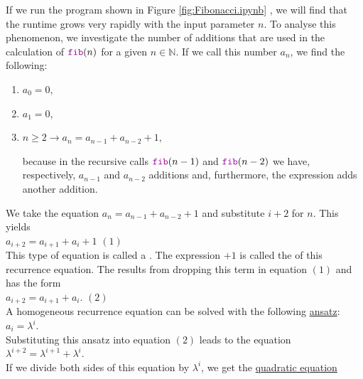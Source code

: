 If we run the program shown in Figure \ref{fig:Fibonacci.ipynb} , we will find that the runtime grows very rapidly with
the input parameter $n$.  To analyse this phenomenon, we investigate the number of additions that are used in the
calculation of $\mytt{fib}(n)$ for a given $n \in \mathbb{N}$.  If we call this number $a_n$, we find
the following:
\begin{enumerate}
\item $a_0 = 0$,
\item $a_1 = 0$,
\item $n \geq 2 \rightarrow a_n = a_{n-1} + a_{n-2} + 1$,

      because in the recursive calls $\mytt{fib}(n-1)$ and $\mytt{fib}(n-2)$ we have, respectively, 
      $a_{n-1}$ and $a_{n-2}$ additions and, furthermore, the expression
       adds another addition.
\end{enumerate}
We take the equation $a_n = a_{n-1} + a_{n-2} + 1$ and substitute $i+2$ for $n$.  This yields
\\[0.2cm]
\hspace*{1.3cm} $a_{i+2} = a_{i+1} + a_i + 1$ \hspace*{\fill} $(1)$
\\[0.2cm]
This type of equation is called a .  The expression $+ 1$ is
called the  of this recurrence equation.
The  
results from dropping this term in equation $(1)$ and has the form
\\[0.2cm]
\hspace*{1.3cm}
$a_{i+2} = a_{i+1} + a_i$. \hspace*{\fill} $(2)$
\\[0.2cm]
A homogeneous recurrence equation can be solved with the following
\href{https://en.wikipedia.org/wiki/Ansatz}{ansatz}:
\\[0.2cm]
\hspace*{1.3cm} $a_i = \lambda^i$. \\[0.2cm]
Substituting this ansatz into equation $(2)$ leads to the equation 
\\[0.2cm]
\hspace*{1.3cm}
$\lambda^{i+2} = \lambda^{i+1} + \lambda^i$.
\\[0.2cm]
If we divide both sides of this equation by $\lambda^i$, we get the
\href{https://en.wikipedia.org/wiki/Quadratic_equation}{quadratic equation}
